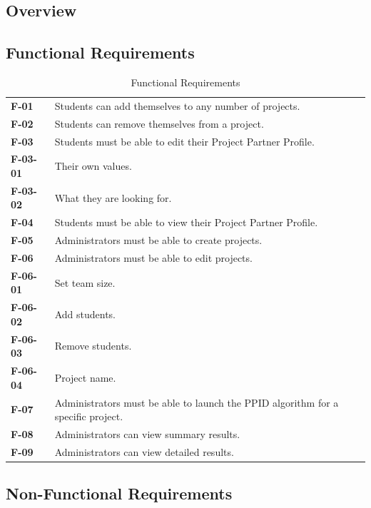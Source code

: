 \documentclass[12pt,letterpaper]{article}
\begin{document}
\subsection{Overview}


\subsection{Functional Requirements}

\begin{table}[H]
	\caption{Functional Requirements}
	\begin{tabu} to 
		F-01 & Students can add themselves to any number of projects. \\
		F-02 & Students can remove themselves from a project. \\
		F-03 & Students must be able to edit their Project Partner Profile. \\
		\ccindent{}F-03-01 & \ccindent{}Their own values. \\
		\ccindent{}F-03-02 & \ccindent{}What they are looking for. \\
		F-04 & Students must be able to view their Project Partner Profile. \\
		F-05 & Administrators must be able to create projects. \\
		F-06 & Administrators must be able to edit projects. \\
		\ccindent{}F-06-01 & \ccindent{}Set team size. \\
		\ccindent{}F-06-02 & \ccindent{}Add students. \\
		\ccindent{}F-06-03 & \ccindent{}Remove students. \\
		\ccindent{}F-06-04 & \ccindent{}Project name. \\
		F-07 & Administrators must be able to launch the PPID algorithm for a specific project. \\
		F-08 & Administrators can view summary results. \\
		F-09 & Administrators can view detailed results. \\
	\end{tabu}
\end{table}

\subsection{Non-Functional Requirements}
\end{document}
